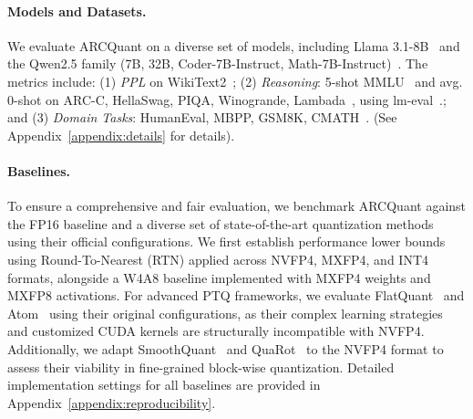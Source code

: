 \documentclass[11pt]{article}
\begin{document}

\paragraph{Models and Datasets.}
We evaluate ARCQuant on a diverse set of models, including Llama 3.1-8B~\citep{grattafiori2024llama3herdmodels} and the Qwen2.5 family (7B, 32B, Coder-7B-Instruct, Math-7B-Instruct)~\citep{qwen2025qwen25technicalreport}. The metrics include: (1) \textit{PPL} on WikiText2~\citep{wikitext}; (2) \textit{Reasoning}: 5-shot MMLU~\citep{mmlu} and avg. 0-shot on ARC-C, HellaSwag, PIQA, Winogrande, Lambada~\citep{allenai:arc, zellers2019hellaswag, piqa, sakaguchi2019winograndeadversarialwinogradschema, lambada}, using lm-eval~\citep{lm-eval}.; and (3) \textit{Domain Tasks}: HumanEval, MBPP, GSM8K, CMATH~\citep{humaneval, mbpp, cobbe2021gsm8k, wei2023cmath}. (See Appendix~\ref{appendix:details} for details).

\paragraph{Baselines.}
To ensure a comprehensive and fair evaluation, we benchmark ARCQuant against the FP16 baseline and a diverse set of state-of-the-art quantization methods using their official configurations.
We first establish performance lower bounds using Round-To-Nearest (RTN) applied across NVFP4, MXFP4, and INT4 formats, alongside a W4A8 baseline implemented with MXFP4 weights and MXFP8 activations.
For advanced PTQ frameworks, we evaluate FlatQuant~\citep{sun2024flatquant} and Atom~\citep{atom} using their original configurations, as their complex learning strategies and customized CUDA kernels are structurally incompatible with NVFP4.
Additionally, we adapt  SmoothQuant~\citep{xiao2024smoothquantaccurateefficientposttraining} and QuaRot~\citep{ashkboos2024quarot} to the NVFP4 format to assess their viability in fine-grained block-wise quantization.
Detailed implementation settings for all baselines are provided in Appendix~\ref{appendix:reproducibility}.
\end{document}
